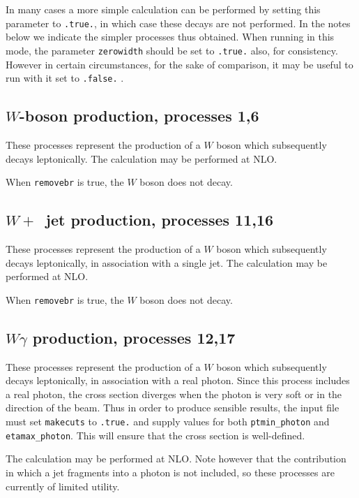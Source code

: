 \documentclass[12pt]{article}
\begin{document}
In many cases a more simple calculation can be performed by setting this
parameter to {\tt .true.}, in which case these decays are not performed. In the
notes below we indicate the simpler processes thus obtained. When running in
this mode, the parameter {\tt zerowidth} should be set to {\tt .true.} also,
for consistency. However in certain circumstances, for the sake of comparison,
it may be useful to run with it set to {\tt .false.} .

\subsection{$W$-boson production, processes 1,6}
\label{subsec:wboson}

These processes represent the production of a $W$ boson which subsequently
decays leptonically. The calculation may be performed at NLO.

When {\tt removebr} is true, the $W$ boson does not decay.

\subsection{$W+$~jet production, processes 11,16}
\label{subsec:w1jet}

These processes represent the production of a $W$ boson which subsequently
decays leptonically, in association with a single jet.
The calculation may be performed at NLO.

When {\tt removebr} is true, the $W$ boson does not decay.

\subsection{$W\gamma$ production, processes 12,17}
\label{subsec:wgamma}

These processes represent the production of a $W$ boson which subsequently
decays leptonically, in association with a real photon.
Since this process includes a real photon, the cross section diverges
when the photon is very soft or in the direction of the beam.
Thus in order to produce sensible results, the input file must set
{\tt makecuts} to {\tt .true.} and supply values for both
{\tt ptmin\_photon} and {\tt etamax\_photon}. This will ensure that
the cross section is well-defined.

The calculation may be performed at NLO. Note however that the contribution
in which a jet fragments into a photon is not included, so these processes 
are currently of limited utility.
\end{document}
